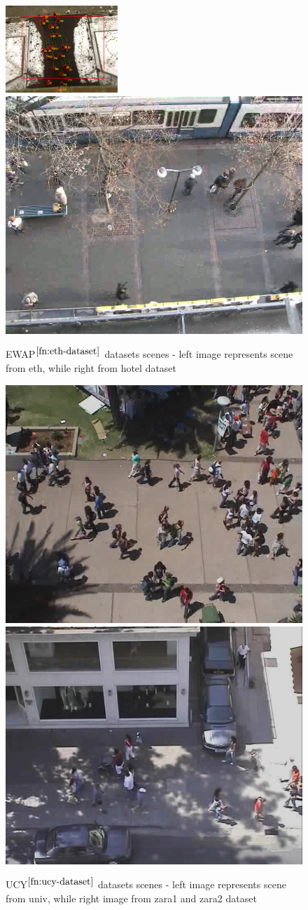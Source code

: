 \begin{figure}[h]
  \centering
  \includegraphics[width=0.40\linewidth]{./figures/image-biwi.png}
  \includegraphics[width=0.40\linewidth]{./figures/biwi-hotel.png}
  \caption{EWAP$^{\ref{fn:eth-dataset}}$ datasets scenes - left image represents scene from eth, while right from hotel dataset \cite[]{UCY-crowds}}\label{fig:eth-dataset-scenes}
\end{figure}

\begin{figure}[h]
  \centering
  \includegraphics[width=0.40\linewidth]{./figures/students_003.jpg}
  \includegraphics[width=0.40\linewidth]{./figures/crowds_zara01.jpg} %
  \caption{UCY$^{\ref{fn:ucy-dataset}}$ datasets scenes - left image represents scene from univ, while right image from zara1 and zara2 dataset \cite[]{ETH-biwi}}\label{fig:crowds-dataset-scenes}
\end{figure}

